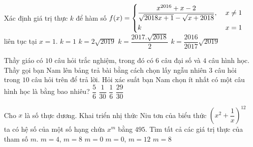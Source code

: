 \begin{ex}%
Xác định giá trị thực $k$ để hàm số $f(x)=\left\{\begin{aligned}&\dfrac{x^{2016}+x-2}{\sqrt{2018x+1}-\sqrt{x+2018}},\;& x\neq 1\\& k & x= 1 \end{aligned}\right.$ liên tục tại $x=1.$
\choice
{$k=1$}
{\True $k=2\sqrt{2019}$}
{$k=\dfrac{2017.\sqrt{2018}}{2}$}
{$k=\dfrac{2016}{2017}\sqrt{2019}$}
\end{ex}

\begin{ex}%
Thầy giáo có $10$ câu hỏi trắc nghiệm, trong đó có $6$ câu đại số và $4$ câu hình học. Thầy gọi bạn Nam lên bảng trả bài bằng cách chọn lấy ngẫu nhiên $3$ câu hỏi trong $10$ câu hỏi trên để trả lời. Hỏi xác suất bạn Nam chọn ít nhất có một câu hình học là bằng bao nhiêu?
\choice
{\True $\dfrac{5}{6}$}
{$\dfrac{1}{30}$}
{$\dfrac{1}{6}$}
{$\dfrac{29}{30}$}
\end{ex}

\begin{ex}%
Cho $x$ là số thực dương. Khai triển nhị thức Niu tơn của biểu thức $\left(x^2+\dfrac{1}{x}\right)^{12}$ ta có hệ số của một số hạng chứa $x^m$ bằng $495$. Tìm tất cả các giá trị  thực của tham số $m$.
\choice
{$m=4$, $m=8$}
{$m=0$}
{\True $m=0$, $m=12$}
{$m=8$}
\end{ex}

